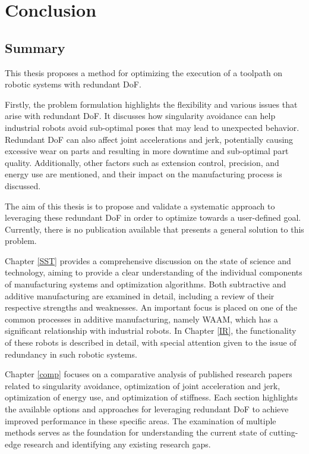 \chapter{Conclusion}%

\section{Summary}%
This thesis proposes a method for optimizing the execution of a toolpath on robotic systems with redundant \acrshort{DoF}.

Firstly, the problem formulation highlights the flexibility and various issues that arise with redundant \acrshort{DoF}. It discusses how singularity avoidance can help industrial robots avoid sub-optimal poses that may lead to unexpected behavior. Redundant \acrshort{DoF} can also affect joint accelerations and jerk, potentially causing excessive wear on parts and resulting in more downtime and sub-optimal part quality. Additionally, other factors such as extension control, precision, and energy use are mentioned, and their impact on the manufacturing process is discussed.

The aim of this thesis is to propose and validate a systematic approach to leveraging these redundant \acrshort{DoF} in order to optimize towards a user-defined goal. Currently, there is no publication available that presents a general solution to this problem.


Chapter \ref{SST} provides a comprehensive discussion on the state of science and technology, aiming to provide a clear understanding of the individual components of manufacturing systems and optimization algorithms. Both subtractive and additive manufacturing are examined in detail, including a review of their respective strengths and weaknesses. An important focus is placed on one of the common processes in additive manufacturing, namely \acrshort{WAAM}, which has a significant relationship with industrial robots. In Chapter \ref{IR}, the functionality of these robots is described in detail, with special attention given to the issue of redundancy in such robotic systems.

Chapter \ref{comp} focuses on a comparative analysis of published research papers related to singularity avoidance, optimization of joint acceleration and jerk, optimization of energy use, and optimization of stiffness. Each section highlights the available options and approaches for leveraging redundant \acrshort{DoF} to achieve improved performance in these specific areas. The examination of multiple methods serves as the foundation for understanding the current state of cutting-edge research and identifying any existing research gaps.

